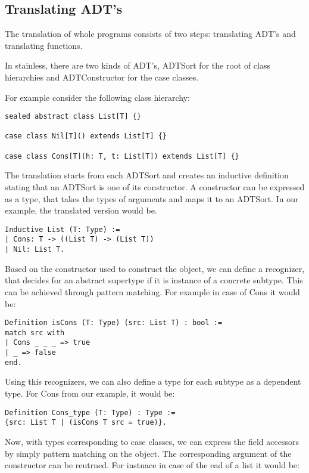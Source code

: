\subsection{Translating ADT's}

The translation of whole programs consists of two steps: translating ADT's and translating functions.

In stainless, there are two kinds of ADT's, ADTSort for the root of class hierarchies and ADTConstructor for the case classes.

For example consider the following class hierarchy:

\begin{lstlisting}[style=myScalastyle]  
sealed abstract class List[T] {}

case class Nil[T]() extends List[T] {}

case class Cons[T](h: T, t: List[T]) extends List[T] {}
\end{lstlisting}

The translation starts from each ADTSort and creates an inductive definition stating that an ADTSort is one of its constructor. A constructor can be expressed as  a type, that takes the types of arguments and maps it to an ADTSort. In our example, the translated version would be.

\begin{lstlisting}[style=myCoqstyle]  
Inductive List (T: Type) :=
| Cons: T -> ((List T) -> (List T))
| Nil: List T.
\end{lstlisting}

Based on the constructor used to construct the object, we can define a recognizer, that decides for an abstract supertype if it is instance of a concrete subtype. This can be achieved through pattern matching. For example in case of Cons it would be:
\begin{lstlisting}[style=myCoqstyle]  
Definition isCons (T: Type) (src: List T) : bool :=
match src with
| Cons _ _ _ => true
| _ => false
end.
\end{lstlisting}

Using this recognizers, we can also define a type for each subtype as a dependent type. For Cons from our example, it would be:

\begin{lstlisting}[style=myCoqstyle]  
Definition Cons_type (T: Type) : Type :=
{src: List T | (isCons T src = true)}. 
\end{lstlisting}

Now, with types corresponding to case classes,  we can express the field accessors by simply pattern matching on the object. The corresponding argument of the constructor can be reutrned. For instnace in case of the ead of a list it would be:

